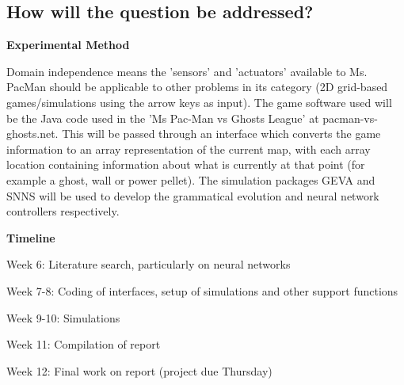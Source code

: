\documentclass[a4paper,12pt]{article}
\begin{document}
\subsection*{How will the question be addressed?}

\textbf{Experimental Method}

Domain independence means the 'sensors' and 'actuators' available to Ms. PacMan should be applicable to other problems in its category (2D grid-based games/simulations using the arrow keys as input). The game software used will be the Java code used in the 'Ms Pac-Man vs Ghosts League' at pacman-vs-ghosts.net. This will be passed through an interface which converts the game information to an array representation of the current map, with each array location containing information about what is currently at that point (for example a ghost, wall or power pellet).  The simulation packages GEVA and SNNS will be used to develop the grammatical evolution and neural network controllers respectively.

\textbf{Timeline}

Week 6: Literature search, particularly on neural networks

Week 7-8: Coding of interfaces, setup of simulations and other support functions

Week 9-10: Simulations

Week 11: Compilation of report

Week 12: Final work on report (project due Thursday)
\end{document}
